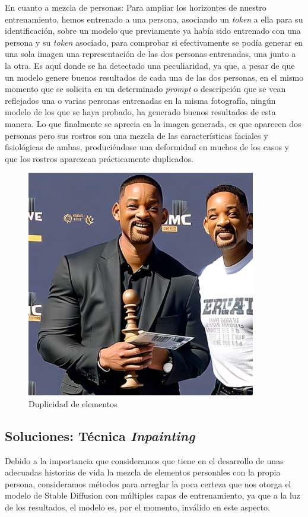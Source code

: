 En cuanto a mezcla de personas: Para ampliar los horizontes de nuestro entrenamiento, hemos entrenado a una persona, asociando un \textit{token} a ella para su identificación, sobre un modelo que previamente ya había sido entrenado con una persona y su \textit{token} asociado, para comprobar si efectivamente se podía generar en una sola imagen una representación de las dos personas entrenadas, una junto a la otra. Es aquí donde se ha detectado una peculiaridad, ya que, a pesar de que un modelo genere buenos resultados de cada una de las dos personas, en el mismo momento que se solicita en un determinado \textit{prompt} o descripción que se vean reflejados una o varias personas entrenadas en la misma fotografía, ningún modelo de los que se haya probado, ha generado buenos resultados de esta manera. Lo que finalmente se aprecia en la imagen generada, es que aparecen dos personas pero sus rostros son una mezcla de las características faciales y fisiológicas de ambas, produciéndose una deformidad en muchos de los casos y que los rostros aparezcan prácticamente duplicados.


\begin{figure}[h]
	\centering
	\includegraphics[width = 0.5
	\textwidth]{Imagenes/Vectorial/duplicidad_will.png}
		\caption{Duplicidad de elementos}
	\label{fig:willpor2}
\end{figure}

\subsection{Soluciones: Técnica \textit{Inpainting}}

Debido a la importancia que consideramos que tiene en el desarrollo de unas adecuadas historias de vida la mezcla de elementos personales con la propia persona, consideramos métodos para arreglar la poca certeza que nos otorga el modelo de Stable Diffusion con múltiples capas de entrenamiento, ya que a la luz de los resultados, el modelo es, por el momento, inválido en este aspecto. \\

